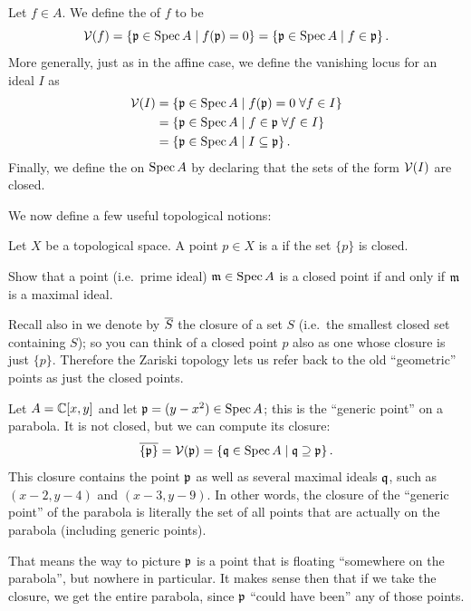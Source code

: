 \begin{definition}
	Let $f \in A$. We define the  of $f$ to be
	\[ \mathcal V(f) = \left\{ \mathfrak p \in \operatorname{Spec} A \mid f(\mathfrak p) = 0 \right\}
		= \left\{ \mathfrak p \in \operatorname{Spec} A \mid f \in \mathfrak p \right\}. \]
	More generally, just as in the affine case,
	we define the vanishing locus for an ideal $I$ as
	\begin{align*}
		\mathcal V(I) &= \left\{ \mathfrak p \in \operatorname{Spec} A \mid f(\mathfrak p)=0 \; \forall f \in I \right\} \\
		&= \left\{ \mathfrak p \in \operatorname{Spec} A \mid f \in \mathfrak p \; \forall f \in I \right\} \\
		&= \left\{ \mathfrak p \in \operatorname{Spec} A \mid I \subseteq \mathfrak p \right\}.
	\end{align*}
	Finally, we define the  on $\operatorname{Spec} A$
	by declaring that the sets of the form $\mathcal V(I)$ are closed.
\end{definition}

We now define a few useful topological notions:
\begin{definition}
	Let $X$ be a topological space.
	A point $p \in X$ is a 
	if the set $\{p\}$ is closed.
\end{definition}
\begin{ques}
	[Mandatory]
	Show that a point (i.e.\ prime ideal)
	$\mathfrak m \in \operatorname{Spec} A$ is a closed point
	if and only if $\mathfrak m$ is a maximal ideal.
\end{ques}
Recall also in  we denote by $\overline S$
the closure of a set $S$ (i.e.\ the smallest closed set containing $S$);
so you can think of a closed point $p$ also
as one whose closure is just $\{p\}$.
Therefore the Zariski topology lets us refer back to the old ``geometric'' points
as just the closed points.

\begin{example}
	Let $A = \mathbb C[x,y]$ and let $\mathfrak p = (y-x^2) \in \operatorname{Spec} A$;
	this is the ``generic point'' on a parabola.
	It is not closed, but we can compute its closure:
	\[
		\overline{\{\mathfrak p\}}
		= \mathcal V(\mathfrak p) = \left\{ \mathfrak q \in \operatorname{Spec} A \mid \mathfrak q \supseteq \mathfrak p \right\}.
	\]
	This closure contains the point $\mathfrak p$ as well
	as several maximal ideals $\mathfrak q$, such as $(x-2,y-4)$ and $(x-3,y-9)$.
	In other words, the closure of the ``generic point'' of the parabola
	is literally the set of all points that are actually on the parabola
	(including generic points).

	That means the way to picture $\mathfrak p$ is a point that
	is floating ``somewhere on the parabola'', but nowhere in particular.
	It makes sense then that if we take the closure,
	we get the entire parabola,
	since $\mathfrak p$ ``could have been'' any of those points.
\end{example}

